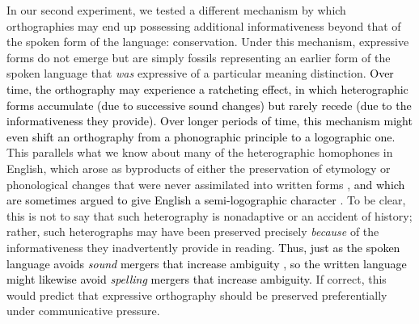 \documentclass[doc,biblatex]{apa7}
\newcommand\newmaterial[1]{\textcolor{black}{#1}}
\begin{document}
In our second experiment, we tested a different mechanism by which orthographies may end up possessing additional informativeness beyond that of the spoken form of the language: conservation. Under this mechanism, expressive forms do not emerge but are simply fossils representing an earlier form of the spoken language that \textit{was} expressive of a particular meaning distinction. \newmaterial{Over time, the orthography may experience a ratcheting effect, in which heterographic forms accumulate (due to successive sound changes) but rarely recede (due to the informativeness they provide). Over longer periods of time, this mechanism might even shift an orthography from a phonographic principle to a logographic one.} This parallels what we know about many of the heterographic homophones in English, which arose as byproducts of either the preservation of etymology or phonological changes that were never assimilated into written forms \parencite{Berg:2021}, \newmaterial{and which are sometimes argued to give English a semi-logographic character \parencite{Chomsky:1968, Coulmas:1991, DeFransis:1989, Zachrisson:1931}}. To be clear, this is not to say that such heterography is nonadaptive or an accident of history; rather, such heterographs may have been preserved precisely \textit{because} of the informativeness they inadvertently provide in reading. \newmaterial{Thus, just as the spoken language avoids \textit{sound} mergers that increase ambiguity \parencite[e.g.,][]{Wedel:2013}, so the written language might likewise avoid \textit{spelling} mergers that increase ambiguity.} If correct, this would predict that expressive orthography should be preserved preferentially under communicative pressure.
\end{document}
